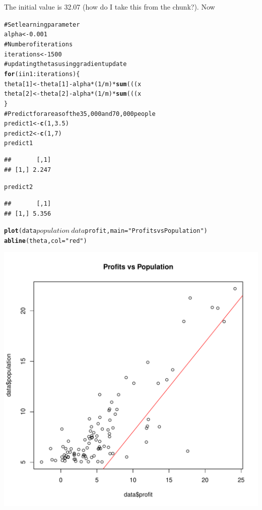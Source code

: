 \documentclass[12pt, a4paper, oneside]{article}\usepackage{graphicx, color}
\makeatletter
\def\maxwidth{ %
  \ifdim\Gin@nat@width>\linewidth
    \linewidth
  \else
    \Gin@nat@width
  \fi
}
\newcommand{\hlfunctioncall}[1]{\textcolor[rgb]{0.501960784313725,0,0.329411764705882}{\textbf{#1}}}%
\newcommand{\hlstring}[1]{\textcolor[rgb]{0.6,0.6,1}{#1}}%
\newcommand{\hlcomment}[1]{\textcolor[rgb]{0.180392156862745,0.6,0.341176470588235}{#1}}%
\newenvironment{kframe}{%
 \def\at@end@of@kframe{}%
 \ifinner\ifhmode%
  \def\at@end@of@kframe{\end{minipage}}%
  \begin{minipage}{\columnwidth}%
 \fi\fi%
 \def\FrameCommand##1{\hskip\@totalleftmargin \hskip-\fboxsep
 \colorbox{shadecolor}{##1}\hskip-\fboxsep
     \hskip-\linewidth \hskip-\@totalleftmargin \hskip\columnwidth}%
 \MakeFramed {\advance\hsize-\width
   \@totalleftmargin\z@ \linewidth\hsize
   \@setminipage}}%
 {\par\unskip\endMakeFramed%
 \at@end@of@kframe}
\newenvironment{knitrout}{}{} %
\makeatother
\begin{document}
The initial value is 32.07 (how do I take this from the chunk?).  Now 
\begin{knitrout}
\color{fgcolor}\begin{kframe}
\begin{alltt}
\hlcomment{# Set learning parameter}
alpha <- 0.001
\hlcomment{# Number of iterations}
iterations <- 1500
\hlcomment{# updating thetas using gradient update}
\hlfunctioncall{for} (i in 1:iterations) \{
    theta[1] <- theta[1] - alpha * (1/m) * \hlfunctioncall{sum}(((x %
    theta[2] <- theta[2] - alpha * (1/m) * \hlfunctioncall{sum}(((x %
\}
\hlcomment{# Predict for areas of the 35,000 and 70,000 people}
predict1 <- \hlfunctioncall{c}(1, 3.5) %
predict2 <- \hlfunctioncall{c}(1, 7) %
predict1
\end{alltt}
\begin{verbatim}
##       [,1]
## [1,] 2.247
\end{verbatim}
\begin{alltt}
predict2
\end{alltt}
\begin{verbatim}
##       [,1]
## [1,] 5.356
\end{verbatim}
\begin{alltt}
\hlfunctioncall{plot}(data$population ~ data$profit, main = \hlstring{"Profits vs Population"})
\hlfunctioncall{abline}(theta, col = \hlstring{"red"})
\end{alltt}
\end{kframe}
\includegraphics[width=\maxwidth]{figure/Regression3} 

\end{knitrout}
\end{document}
